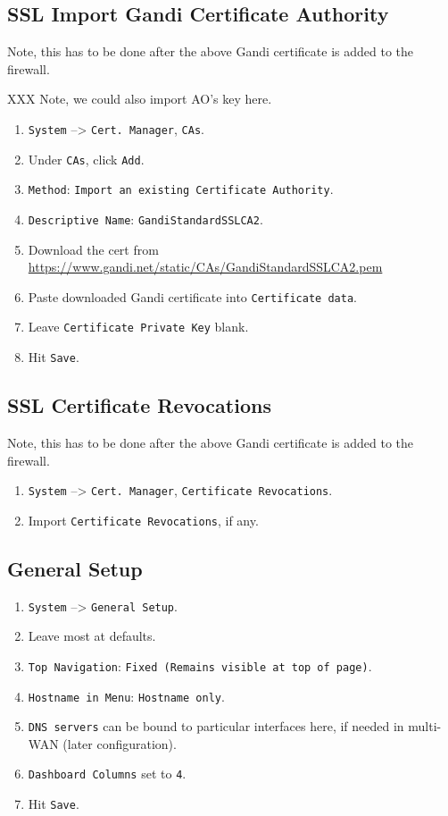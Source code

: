\subsection{SSL Import Gandi Certificate Authority}
Note, this has to be done after the above Gandi certificate is added to the firewall.

XXX Note, we could also import AO's key here.

\begin{enumerate}
 \item \texttt{System} --> \texttt{Cert. Manager}, \texttt{CAs}.
 \item Under \texttt{CAs}, click \texttt{Add}.
 \item \texttt{Method}: \texttt{Import an existing Certificate Authority}.
 \item \texttt{Descriptive Name}: \texttt{GandiStandardSSLCA2}.
 \item Download the cert from \url{https://www.gandi.net/static/CAs/GandiStandardSSLCA2.pem}
 \item Paste downloaded Gandi certificate into \texttt{Certificate data}.
 \item Leave \texttt{Certificate Private Key} blank.
 \item Hit \texttt{Save}.
\end{enumerate}

\subsection{SSL Certificate Revocations}
Note, this has to be done after the above Gandi certificate is added to the firewall.

\begin{enumerate}
 \item \texttt{System} --> \texttt{Cert. Manager}, \texttt{Certificate Revocations}.
 \item Import \texttt{Certificate Revocations}, if any.
\end{enumerate}

\subsection{General Setup}
\begin{enumerate}
 \item \texttt{System} --> \texttt{General Setup}.
 \item Leave most at defaults.
 \item \texttt{Top Navigation}: \texttt{Fixed (Remains visible at top of page)}.
 \item \texttt{Hostname in Menu}: \texttt{Hostname only}.
 \item \texttt{DNS servers} can be bound to particular interfaces here, if needed in multi-WAN (later configuration).
 \item \texttt{Dashboard Columns} set to \texttt{4}.
 \item Hit \texttt{Save}.
\end{enumerate}

